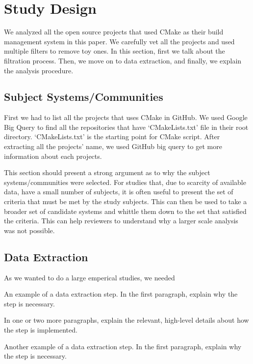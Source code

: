 
\section{Study Design}
\label{sec:design}

We analyzed all the open source projects that used CMake as their build management system in this paper.
We carefully vet all the projects and used multiple filters to remove toy ones.
In this section, first we talk about the filtration process.
Then, we move on to data extraction, and finally, we explain the analysis procedure.

\subsection{Subject Systems/Communities}\label{subsec:subject-systems/communities}


First we had to list all the projects that uses CMake in GitHub.
We used Google Big Query to find all the repositories that have `CMakeLists.txt' file in their root directory.
`CMakeLists.txt' is the starting point for CMake script.
After extracting all the projects' name, we used GitHub big query to get more information about each projects.


This section should present a strong argument as to why the subject systems/communities were selected.
For studies that, due to scarcity of available data, have a small number of subjects, it is often useful to present the set of criteria that must be met by the study subjects.
This can then be used to take a broader set of candidate systems and whittle them down to the set that satisfied the criteria.
This can help reviewers to understand why a larger scale analysis was not possible.

\subsection{Data Extraction}

As we wanted to do a large emperical studies, we needed

An example of a data extraction step.
In the first paragraph, explain why the step is necessary.

In one or two more paragraphs, explain the relevant, high-level details about how the step is implemented.

Another example of a data extraction step.
In the first paragraph, explain why the step is necessary.

